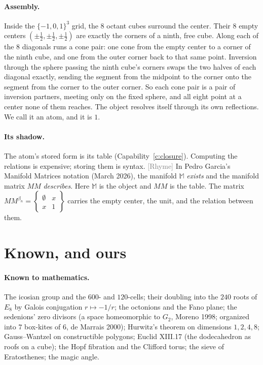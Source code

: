 \documentclass[11pt]{article}
\newcommand{\rhyme}{\textsf{\small\textcolor{gray}{[Rhyme]}}}
\theoremstyle{definition}\newtheorem{claim}{Capability}
\theoremstyle{remark}
\begin{document}
\paragraph{Assembly.} Inside the $\{-1,0,1\}^3$ grid, the $8$ octant cubes surround the center. Their $8$ empty centers $(\pm\tfrac12,\pm\tfrac12,\pm\tfrac12)$ are exactly the corners of a ninth, free cube. Along each of the $8$ diagonals runs a cone pair: one cone from the empty center to a corner of the ninth cube, and one from the outer corner back to that same point. Inversion through the sphere passing the ninth cube's corners swaps the two halves of each diagonal exactly, sending the segment from the midpoint to the corner onto the segment from the corner to the outer corner. So each cone pair is a pair of inversion partners, meeting only on the fixed sphere, and all eight point at a center none of them reaches. The object resolves itself through its own reflections. We call it an atom, and it is $1$.

\paragraph{Its shadow.} The atom's stored form is its table (Capability~\ref{c:closure}). Computing the relations is expensive; storing them is syntax. \rhyme{} In Pedro Garcia's Manifold Matrices notation (March 2026), the manifold $\mathbb{M}$ \emph{exists} and the manifold matrix $MM$ \emph{describes}. Here $\mathbb{M}$ is the object and $MM$ is the table. The matrix $MM^{\beta_n}=\left\{\begin{smallmatrix}\emptyset & x\\ x & 1\end{smallmatrix}\right\}$ carries the empty center, the unit, and the relation between them.

\section{Known, and ours}
\paragraph{Known to mathematics.}
The icosian group and the $600$- and $120$-cells; their doubling into the $240$ roots of $E_8$ by Galois conjugation $r\mapsto -1/r$; the octonions and the Fano plane; the sedenions' zero divisors (a space homeomorphic to $G_2$, Moreno 1998; organized into $7$ box-kites of $6$, de Marrais 2000); Hurwitz's theorem on dimensions $1,2,4,8$; Gauss--Wantzel on constructible polygons; Euclid XIII.17 (the dodecahedron as roofs on a cube); the Hopf fibration and the Clifford torus; the sieve of Eratosthenes; the magic angle.
\end{document}
